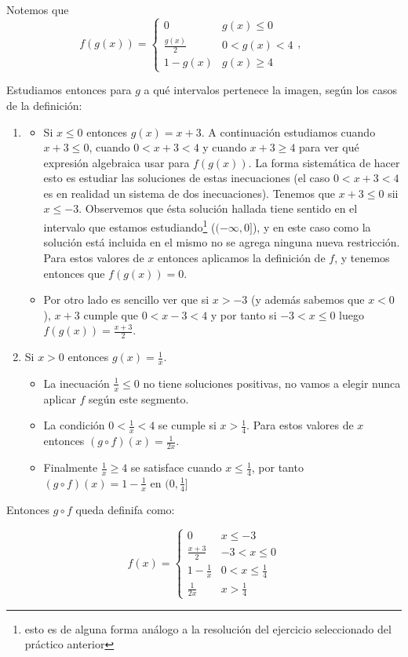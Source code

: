 \documentclass[10pt,a4paper]{article}
\renewcommand{\o}{\circ}
\begin{document}
\noindent
Notemos que
$$f(g(x)) = \left \{ \begin{matrix} 0 & g(x) \leq 0
\\ \frac{g(x)}{2} & 0 < g(x) < 4 
\\ 1- g(x) & g(x) \geq 4 \end{matrix}\right. , \hspace{1cm}
$$



Estudiamos entonces para $g$ a qué intervalos pertenece la imagen,
según los casos de la definición:

\begin{enumerate}
\item
  \begin{itemize}
  \item
    Si $x \leq 0$ entonces $g(x) = x+3$. A continuación estudiamos cuando
  $x+3 \leq 0$, cuando $0 < x+3 < 4$ y cuando $x+3 \geq 4$ para ver qué
  expresión algebraica usar para $f(g(x))$.
  La forma sistemática de hacer esto es estudiar las soluciones de estas
  inecuaciones (el caso $0 < x+3 < 4$ es en realidad un sistema de dos
  inecuaciones).
  Tenemos que $x+3 \leq 0$ sii $x \leq -3$.
  Observemos que ésta solución hallada tiene
  sentido en el intervalo que estamos estudiando\footnote{esto es de alguna
  forma análogo a la resolución del ejercicio seleccionado del
  práctico anterior} ($(-\infty, 0]$),
  y en este caso como la solución está incluida en el mismo no se agrega
  ninguna nueva restricción.
  Para estos valores de $x$ entonces aplicamos la definición de $f$,
  y tenemos entonces que $f(g(x)) = 0$.
  \item Por otro lado es sencillo ver que si
  $x> -3$ (y además sabemos que $x<0$),
  $x+3$ cumple que $0<x-3<4$ y por tanto
  si $ -3 < x \leq 0$ luego $f(g(x)) = \frac{x+3}{2}$.
  \end{itemize}
\item Si $x > 0$ entonces $g(x) = \frac{1}{x}$.
  \begin{itemize}
  \item La inecuación $\frac{1}{x} \leq 0$ no tiene soluciones positivas,
    no vamos a elegir nunca aplicar $f$ según este segmento.

  \item La condición $0 < \frac{1}{x}< 4$ se cumple si $ x > \frac{1}{4}$.
    Para estos valores de $x$ entonces $(g\o f) (x) = \frac{1}{2x}$.
    
  \item Finalmente $\frac{1}{x} \geq 4$ se satisface cuando
    $x \leq \frac{1}{4}$, por tanto  $(g\o f) (x) = 1 - \frac{1}{x}$ en
    $(0,\frac{1}{4}]$
   
  \end{itemize}
  
\end{enumerate}


Entonces $g \o f$ queda definifa como:

$$
f(x) = \left \{
\begin{matrix} 0 & x \leq -3
  \\ \frac{x+3}{2} & -3 < x \leq 0 
  \\ 1- \frac{1}{x} &  0 < x \leq \frac{1}{4}
  \\ \frac{1}{2x} & x > \frac{1}{4}
\end{matrix}\right.
$$
\end{document}
